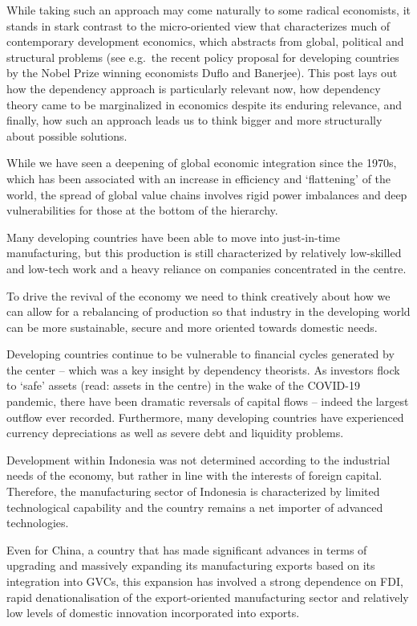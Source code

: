 \documentclass[
]{book}
\begin{document}
While taking such an approach may come naturally to some radical economists, it stands in stark contrast to the micro-oriented view that characterizes much of contemporary development economics, which abstracts from global, political and structural problems (see e.g.~the recent policy proposal for developing countries by the Nobel Prize winning economists Duflo and Banerjee). This post lays out how the dependency approach is particularly relevant now, how dependency theory came to be marginalized in economics despite its enduring relevance, and finally, how such an approach leads us to think bigger and more structurally about possible solutions.

While we have seen a deepening of global economic integration since the 1970s, which has been associated with an increase in efficiency and `flattening' of the world, the spread of global value chains involves rigid power imbalances and deep vulnerabilities for those at the bottom of the hierarchy.

Many developing countries have been able to move into just-in-time manufacturing, but this production is still characterized by relatively low-skilled and low-tech work and a heavy reliance on companies concentrated in the centre.

To drive the revival of the economy we need to think creatively about how we can allow for a rebalancing of production so that industry in the developing world can be more sustainable, secure and more oriented towards domestic needs.

Developing countries continue to be vulnerable to financial cycles generated by the center -- which was a key insight by dependency theorists. As investors flock to `safe' assets (read: assets in the centre) in the wake of the COVID-19 pandemic, there have been dramatic reversals of capital flows -- indeed the largest outflow ever recorded. Furthermore, many developing countries have experienced currency depreciations as well as severe debt and liquidity problems.

Development within Indonesia was not determined according to the industrial needs of the economy, but rather in line with the interests of foreign capital. Therefore, the manufacturing sector of Indonesia is characterized by limited technological capability and the country remains a net importer of advanced technologies.

Even for China, a country that has made significant advances in terms of upgrading and massively expanding its manufacturing exports based on its integration into GVCs, this expansion has involved a strong dependence on FDI, rapid denationalisation of the export-oriented manufacturing sector and relatively low levels of domestic innovation incorporated into exports.
\end{document}

